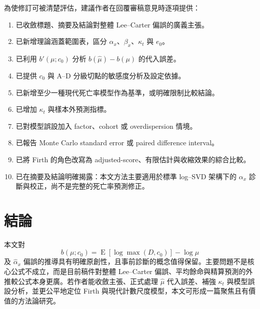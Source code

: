 \documentclass[12pt,a4paper]{article}
\begin{document}
為使修訂可被清楚評估，建議作者在回覆審稿意見時逐項提供：

\begin{enumerate}
  \item 已收斂標題、摘要及結論對整體 Lee--Carter 偏誤的廣義主張。
  \item 已新增理論涵蓋範圍表，區分 $\alpha_x$、$\beta_x$、$\kappa_t$ 與 $e_0$。
  \item 已利用 $b'(\mu;c_0)$ 分析 $b(\widehat\mu)-b(\mu)$ 的代入誤差。
  \item 已提供 $c_0$ 與 A--D 分級切點的敏感度分析及設定依據。
  \item 已新增至少一種現代死亡率模型作為基準，或明確限制比較結論。
  \item 已增加 $\kappa_t$ 與樣本外預測指標。
  \item 已對模型誤設加入 factor、cohort 或 overdispersion 情境。
  \item 已報告 Monte Carlo standard error 或 paired difference interval。
  \item 已將 Firth 的角色改寫為 adjusted-score、有限估計與收縮效果的綜合比較。
  \item 已在摘要及結論明確揭露：本文方法主要適用於標準 log--SVD 架構下的 $\alpha_x$ 診斷與校正，尚不是完整的死亡率預測修正。
\end{enumerate}

\section*{結論}

本文對
\[
b(\mu;c_0)=\operatorname{E}[\log\max(D,c_0)]-\log\mu
\]
及 $\widehat\alpha_x$ 偏誤的推導具有明確原創性，且事前診斷的概念值得保留。主要問題不是核心公式不成立，而是目前稿件對整體 Lee--Carter 偏誤、平均餘命與精算預測的外推較公式本身更廣。若作者能收斂主張、正式處理 $\widehat\mu$ 代入誤差、補強 $\kappa_t$ 與模型誤設分析，並更公平地定位 Firth 與現代計數尺度模型，本文可形成一篇聚焦且有價值的方法論研究。
\end{document}
